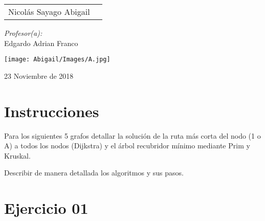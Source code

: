\documentclass[12pt]{article}
\begin{document}
\begin{titlepage}
\begin{center}
\begin{minipage}{0.5\textwidth}
\begin{flushleft}
                        \begin{tabular}{ll}
                         Nicolás Sayago Abigail\\
                    \end{tabular}
                    \end{flushleft}
                \end{minipage}%
                \begin{minipage}{0.5\textwidth}
                    \begin{flushright} \large
                        \emph{Profesor(a):} \\
                        Edgardo Adrian Franco  \\
                    \end{flushright}
                \end{minipage}
                \vfill
                \begin{minipage}{0.5\textwidth}
                    \begin{center} \large
                        \texttt{[image: Abigail/Images/A.jpg]}
                    \end{center}
                \end{minipage}
                    
                {\large 23 Noviembre de 2018}
            \end{center}
        \end{titlepage}
    \tableofcontents
  \newpage

  \section{Instrucciones}

  Para los siguientes 5 grafos detallar la solución de la ruta más corta del nodo (1 o A) a todos los nodos (Dijkstra) y el árbol recubridor mínimo mediante Prim y Kruskal.

  Describir de manera detallada los algoritmos y sus pasos.

  
  \section{Ejercicio 01}
\end{document}
